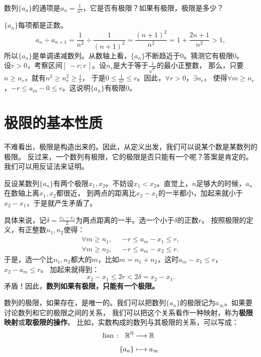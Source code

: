 \documentclass[12pt,UTF8,fontset=none]{ctexbook}
\begin{document}
\begin{et}
数列$\{a_n\}$的通项是$\displaystyle a_n = \frac{1}{n^2}$，它是否有极限？如果有极限，极限是多少？    
\end{et}
\begin{so}
    $\{a_n\}$每项都是正数。
    $$a_{n} \div a_{n+1} = \frac{1}{n^2} \div \frac{1}{(n+1)^2} = \frac{(n+1)^2}{n^2} = 1 + \frac{2n+1}{n^2} > 1,$$
    所以$\{a_n\}$是单调递减数列。从数轴上看，$\{a_n\}$不断趋近于$0$。猜测它有极限$0$。\\
    设$r>0$，考察区间$[\,-r;r\,]$。设$n_r$是大于等于$\frac{1}{\sqrt{r}}$的最小正整数，
    那么，只要$n \geqslant n_r$，就有$n^2 \geqslant n_r^2 \geqslant \frac{1}{r}$，
    于是$0 \leqslant \frac{1}{n^2} \leqslant r$。因此，$\forall r > 0$，$\exists n_r$，
    使得$\forall m \geqslant n_r$，$ -r  \leqslant a_m - 0 \leqslant r$。这说明$\{a_n\}$有极限$0$。    
\end{so}

\section{极限的基本性质}
不难看出，极限是构造出来的。因此，从定义出发，我们可以说某个数是某数列的极限。
反过来，一个数列有极限，它的极限是否只能有一个呢？答案是肯定的。我们可以用反证法来证明。

反设某数列$\{a_n\}$有两个极限$x_1, x_2$。不妨设$x_1 < x_2$。直觉上，$n$足够大的时候，$a_n$在数轴上离$x_1, x_2$都很近，
到两点的距离比$x_2 - x_1$的一半都小，加起来就小于$x_2 - x_1$，于是就产生矛盾了。

具体来说，记$\delta = \frac{x_2 - x_1}{2}$为两点距离的一半。选一个小于$\delta$的正数$r$。
按照极限的定义，有正整数$n_1, n_2$使得：
\begin{align*}
    \forall m \geqslant n_1 , \;\,\,& -r \leqslant a_m - x_1 \leqslant r ,  \\
    \forall m \geqslant n_2 , \;\,\,& -r \leqslant a_m - x_2 \leqslant r .  
\end{align*}
于是，选一个比$n_1,n_2$都大的$m$，比如$m=n_1+n_2$，这时$a_m - x_1 \leqslant r$，$x_2 - a_m \leqslant r$。
加起来就得到：
$$x_2 - x_1 \leqslant 2r < 2\delta = x_2 - x_1.$$
矛盾！因此，\textbf{数列如果有极限，只能有一个极限。}

数列的极限，如果存在，是唯一的。我们可以把数列$\{a_n\}$的极限记为$a_\infty$。如果要讨论数列和它的极限之间的关系，
我们可以把这个关系看作一种映射，称为\textbf{极限映射}或\textbf{取极限的操作}。
比如，实数构成的数列与其极限的关系，可以写成：
\begin{align*}
    \underset{}{\operatorname{lian}\,} : \;\,\, \mathbb{R}^\mathbb{N} &\longrightarrow \mathbb{R}  \\
    \{a_n\} &\longmapsto a_\infty 
\end{align*}
\end{document}
